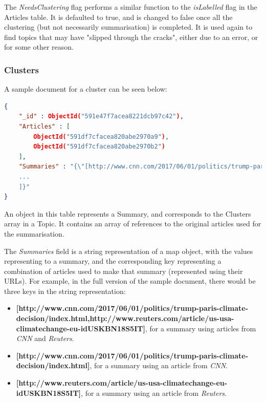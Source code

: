 \documentclass[12pt]{article}
\begin{document}
The \emph{NeedsClustering} flag performs a similar function to the \emph{isLabelled} flag in the Articles table. It is defaulted to true, and is changed to false once all the clustering (but not necessarily summarisation) is completed. It is used again to find topics that may have "slipped through the cracks", either due to an error, or for some other reason. 

\subsubsection{Clusters}

A sample document for a cluster can be seen below:

\begin{lstlisting}[language=json, firstnumber=1, caption={A sample document in the Summaries table},captionpos=b]
{
    "_id" : ObjectId("591e47f7acea8221dcb97c42"),
    "Articles" : [ 
        ObjectId("591df7cfacea820abe2970a9"), 
        ObjectId("591df7cfacea820abe2970b2")
    ],
    "Summaries" : "{\"[http://www.cnn.com/2017/06/01/politics/trump-paris-climate-decision/index.html,http://www.reuters.com/article/us-usa-climatechange-eu-idUSKBN18S5IT]\":[{\"sentence\":\"BRUSSELS The European Union said on Thursday it had made its position on climate change clear and was not engaged in last-minute lobbying of the Trump administration to keep the United States aboard the Paris climate accord.\",\"sentencePosition\":0.0,\"absoluteSentencePosition\":0,\"identifier\":26,\"relatedNodes\":[],\"source\":\"reuters\"}
    ...
    ]}"
}
\end{lstlisting}

An object in this table represents a Summary, and corresponds to the Clusters array in a Topic. It contains an array of references to the original articles used for the summarisation.

The \emph{Summaries} field is a string representation of a map object, with the values representing to a summary, and the corresponding key representing a combination of articles used to make that summary (represented using their URLs). For example, in the full version of the sample document, there would be three keys in the string representation:

\begin{sloppypar}
\begin{itemize}
	\item \textbf{[http://www.cnn.com/2017/06/01/politics/trump-paris-climate-decision/index.html,http://www.reuters.com/article/us-usa-climatechange-eu-idUSKBN18S5IT]{}}, for a summary using articles from \emph{CNN} and \emph{Reuters}.
	\item \textbf{[http://www.cnn.com/2017/06/01/politics/trump-paris-climate-decision/index.html]}, for a summary using an article from \emph{CNN}.
	\item \textbf{[http://www.reuters.com/article/us-usa-climatechange-eu-idUSKBN18S5IT]}, for a summary using an article from \emph{Reuters}. \\
\end{itemize}
\end{sloppypar}
\end{document}
